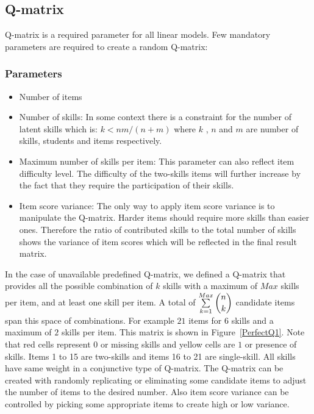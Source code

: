 \subsection{Q-matrix}
\label{Q-MatrixObtain}
Q-matrix is a required parameter for all linear models. Few mandatory parameters are required to create a random Q-matrix:

\subsubsection{Parameters}
\begin{itemize}
\item Number of items 
\item Number of skills: In some context there is a constraint for the number of latent skills which is: $k<nm/(n+m)$ \protect\citep{lee1999learning} where $k$ , $n$ and $m$ are number of skills, students and items respectively.
\item Maximum number of skills per item: This parameter can also reflect item difficulty level. The difficulty of  the two-skills items will further increase by the fact that they require the participation of their skills.
\item Item score variance: The only way to apply item score variance is to manipulate the Q-matrix. Harder items should require more skills than easier ones. Therefore the ratio of contributed skills to the total number of skills shows the variance of item scores which will be reflected in the final result matrix.
\end{itemize}



In the case of unavailable predefined Q-matrix, we defined a Q-matrix that provides all the possible combination of $k$ skills with a maximum of $Max$ skills per item, and at least one skill per item. A total of $\sum\limits_{k=1}^{Max} \dbinom{n}{k}$ candidate items span this space of combinations. For example $21$ items for $6$ skills and a maximum of $2$ skills per item. This matrix is shown in Figure~\ref{PerfectQ1}. Note that red cells represent $0$ or missing skills and yellow cells are $1$ or presence of skills. Items 1 to 15 are two-skills and items 16 to 21 are single-skill. All skills have same weight in a conjunctive type of Q-matrix. The Q-matrix can be created with randomly replicating or eliminating some candidate items to adjust the number of items to the desired number. Also item score variance can be controlled by picking some appropriate items to create high or low variance.


